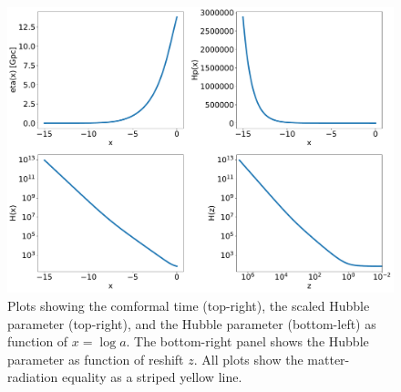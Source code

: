 \documentclass[a4paper]{article}
\begin{document}
\begin{figure}[H]
    \centering
    \includegraphics[scale=0.4]{../figs/Eta.pdf}
    \caption{Plots showing the comformal time (top-right), the scaled Hubble parameter (top-right), and the Hubble parameter (bottom-left) as function of $x=\log{a}$. The bottom-right panel shows the Hubble parameter as function of reshift $z$. All plots show the matter-radiation equality as a striped yellow line.}
    \label{fig:Eta}
\end{figure}
\end{document}
